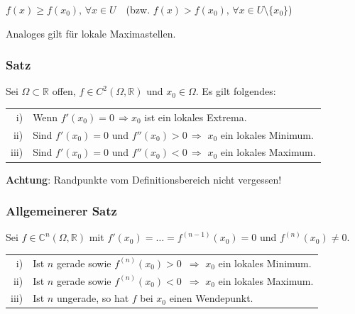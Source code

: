 \documentclass[a4paper, fontsize = 8pt, landscape]{scrartcl}
\newcommand{\R}[0]{\mathbb{R}}
\newcommand{\C}[0]{\mathbb{C}}
\begin{document}
\begin{multicols*}{3}
    \begin{center}
        $f(x) \geq f(x_0), \, \forall x \in U$ \,\, (bzw. $f(x) > f(x_0), \, \forall x \in U\setminus \{x_0\}$)
    \end{center}

    Analoges gilt für lokale Maximastellen.

    \subsubsection{Satz}

    Sei $\Omega \subset \R$ offen, $f \in C^2(\Omega, \R)$ und $x_0 \in \Omega$. Es gilt folgendes:

    \begin{center}
        \renewcommand{\arraystretch}{1.25}
        \begin{tabular}{r l} \toprule
            i)   & Wenn $f'(x_0) = 0 \, \Rightarrow x_0$ ist ein lokales Extrema.                  \\
            ii)  & Sind $f'(x_0) = 0$ und $f''(x_0) > 0 \, \Rightarrow$ $x_0$ ein lokales Minimum. \\
            iii) & Sind $f'(x_0) = 0$ und $f''(x_0) < 0 \, \Rightarrow$ $x_0$ ein lokales Maximum. \\
            \bottomrule
        \end{tabular}
    \end{center}

    \textbf{Achtung}: Randpunkte vom Definitionsbereich nicht vergessen!

    \subsubsection{Allgemeinerer Satz}

    Sei $f \in \C^n(\Omega, \R)$ mit $f'(x_0) = \dots = f^{(n-1)}(x_0) = 0$ und $f^{(n)}(x_0) \neq 0$.

    \begin{center}
        \renewcommand{\arraystretch}{1.25}
        \begin{tabular}{r l} \toprule
            i)   & Ist $n$ gerade sowie $f^{(n)}(x_0) > 0$ $\,\Rightarrow$ $x_0$ ein lokales Minimum. \\
            ii)  & Ist $n$ gerade sowie $f^{(n)}(x_0) < 0$ $\,\Rightarrow$ $x_0$ ein lokales Maximum. \\
            iii) & Ist $n$ ungerade, so hat $f$ bei $x_0$ einen Wendepunkt.                           \\
            \bottomrule
        \end{tabular}
    \end{center}



\end{multicols*}
\end{document}
